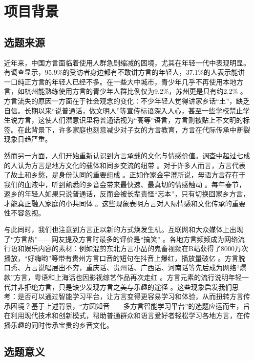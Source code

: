 
\chapter{项目背景}
\section{选题来源}
近年来，中国方言面临着使用人群急剧缩减的困境，尤其在年轻一代中表现明显。有调查显示，95.9\%的受访者身边都有不敢讲方言的年轻人，37.1\%的人表示能讲一口纯正方言的年轻人已经不多。在一些大中城市，青少年几乎不再使用本地方言，如杭州能熟练使用方言的青少年人群比例仅为9.2\%，苏州更是只有约2.2\% 。方言流失的原因一方面在于社会观念的变化：不少年轻人觉得讲家乡话“土”，缺乏自信。长期以来“说普通话，做文明人”等宣传标语深入人心，甚至一些学校禁止学生说方言，这使人们潜意识里将普通话视为“高等”语言，方言则被贴上不文明的标签。在此背景下，许多家庭也刻意减少对子女的方言教育，方言在代际传承中断裂现象日趋严重。

然而另一方面，人们开始重新认识到方言承载的文化与情感价值。调查中超过七成的人认为方言是地方文化的载体和同乡交流的纽带 。对于许多人而言，方言代表了故土和乡愁，是身份认同的重要组成 。正如作家金宇澄所说，母语方言存在于我们的血液中，听到熟悉的乡音会带来最快速、最真切的情感触动 。每年春节，返乡的年轻人如果只说普通话，反而会被长辈责怪“忘本”，只有切换回家乡方言，才能真正融入家庭的小共同体  。这些现象表明方言对人际情感和文化传承的重要性不容忽视。

与此同时，我们也注意到方言正以新的方式焕发生机。互联网和大众媒体上出现了“方言热”——网友提及方言时最多的评价是“搞笑” 。各地方言频频成为网络流行语和娱乐内容的素材：例如混剪东北方言小品的鬼畜视频在B站获得了8000万次播放，“好嗨哟”等带有贵州方言口音的短句在抖音上爆红，播放量破亿 。方言脱口秀、方言说唱层出不穷，重庆话、贵州话、广西话、河南话等先后成为网络“爆款”方言，粤语和上海话也因影视综艺作品再次走红 。方言元素的流行说明年轻一代并非拒绝方言，只是缺少发现方言之美与乐趣的途径 。这些现象启发我们思考：是否可以通过智能学习平台，让方言变得更容易学习和体验，从而扭转方言传承困境？基于上述背景，“方圆知音——多方言智能学习平台”的选题应运而生，旨在利用现代技术和创新模式，帮助普通群众和语言爱好者轻松学习各地方言，在传播乐趣的同时传承宝贵的乡音文化。

\section{选题意义}
